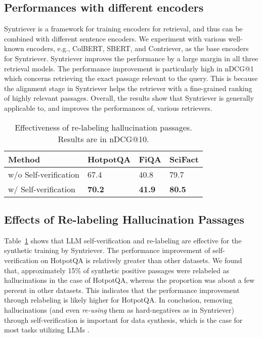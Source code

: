 \subsection{Performances with different encoders}
Syntriever is a framework for training encoders for retrieval, and thus can be combined with different sentence encoders. We experiment with various well-known encoders, e.g., ColBERT, SBERT, and Contriever, as the base encoders for Syntriever. Syntriever improves the performance by a large margin in all three retrieval models. The performance improvement is particularly high in nDCG@1 which concerns retrieving the exact passage relevant to the query. 
This is because the alignment stage in Syntriever helps the retriever with a fine-grained ranking of highly relevant passages. Overall, the results show that Syntriever is generally applicable to, and improves the performances of, various retrievers.

\begin{table}[t!]
\centering

\begin{adjustbox}{width=.4\textwidth}
\begin{tabular}{l|l|l|l}
\hline
\textbf{Method}  & \textbf{HotpotQA}  & \textbf{FiQA}  & \textbf{SciFact} \\ \hline
\multirow{1}{*}{w/o Self-verification} & 67.4  & 40.8 & 79.7             \\
\multirow{1}{*}{w/ Self-verification}  & 
\textbf{70.2} & \textbf{41.9} & \textbf{80.5}                 \\ \hline
\end{tabular}
\end{adjustbox}
\caption{Effectiveness of re-labeling hallucination passages. Results are in nDCG@10.}
\label{tab:ablation_verification}
\end{table}

\subsection{Effects of Re-labeling Hallucination Passages}\label{relabel}
Table~\ref{tab:ablation_verification} shows that LLM self-verification and re-labeling are effective for the synthetic training by Syntriever. The performance improvement of self-verification on HotpotQA is relatively greater than other datasets. We found that, approximately 15\% of synthetic positive passages were relabeled as hallucinations in the case of HotpotQA, whereas the proportion was about a few percent in other datasets. This indicates that the performance improvement through relabeling is likely higher for HotpotQA. In conclusion, removing hallucinations (and even \emph{re-using} them as hard-negatives as in Syntriever) through self-verification is important for data synthesis, which is the case for most tasks utilizing LLMs \cite{weng2023large}.


